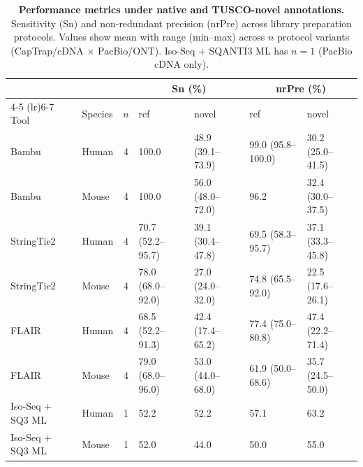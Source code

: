 {  %
  \begin{table}[htbp]
      \centering
      \caption{\textbf{Performance metrics under native and TUSCO-novel annotations.} Sensitivity (Sn) and non-redundant precision (nrPre) across library preparation protocols. Values show mean with range (min--max) across $n$ protocol variants (CapTrap/cDNA $\times$ PacBio/ONT). Iso-Seq + SQANTI3 ML has $n=1$ (PacBio cDNA only).}
      \label{tab:3}
      {\footnotesize
      \begin{tabular*}{\textwidth}{@{\extracolsep{\fill}}llcllll@{}}
          \toprule
          & & & \multicolumn{2}{c}{Sn (\%)} & \multicolumn{2}{c}{nrPre (\%)} \\
          \cmidrule(lr){4-5} \cmidrule(lr){6-7}
          Tool & Species & $n$ & ref & novel & ref & novel \\
          \midrule
          Bambu & Human & 4 & 100.0 & 48.9 (39.1--73.9) & 99.0 (95.8--100.0) & 30.2 (25.0--41.5) \\
          Bambu & Mouse & 4 & 100.0 & 56.0 (48.0--72.0) & 96.2 & 32.4 (30.0--37.5) \\
          StringTie2 & Human & 4 & 70.7 (52.2--95.7) & 39.1 (30.4--47.8) & 69.5 (58.3--95.7) & 37.1 (33.3--45.8) \\
          StringTie2 & Mouse & 4 & 78.0 (68.0--92.0) & 27.0 (24.0--32.0) & 74.8 (65.5--92.0) & 22.5 (17.6--26.1) \\
          FLAIR & Human & 4 & 68.5 (52.2--91.3) & 42.4 (17.4--65.2) & 77.4 (75.0--80.8) & 47.4 (22.2--71.4) \\
          FLAIR & Mouse & 4 & 79.0 (68.0--96.0) & 53.0 (44.0--68.0) & 61.9 (50.0--68.6) & 35.7 (24.5--50.0) \\
          Iso-Seq + SQ3 ML & Human & 1 & 52.2 & 52.2 & 57.1 & 63.2 \\
          Iso-Seq + SQ3 ML & Mouse & 1 & 52.0 & 44.0 & 50.0 & 55.0 \\
          \bottomrule
      \end{tabular*}
      }
  \end{table}

}
